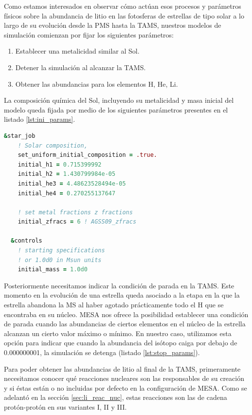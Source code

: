 Como estamos interesados en observar cómo actúan esos procesos y parámetros físicos sobre la abundancia de litio en las fotosferas de estrellas de tipo solar a lo largo de su evolución desde la PMS hasta la TAMS, nuestros modelos de simulación comienzan por fijar los siguientes parámetros:

\begin{enumerate}
    \item Establecer una metalicidad similar al Sol.
    \item Detener la simulación al alcanzar la TAMS.
    \item Obtener las abundancias para los elementos H, He, Li.
\end{enumerate}

La composición química del Sol, incluyendo su metalicidad y masa inicial del modelo queda fijada por medio de los siguientes parámetros presentes en el listado \ref{lst:ini_params}.

\begin{lstlisting}[language=Fortran, float, caption={Parametrización de la metalicidad y masa inicial de la estrella.}, label={lst:ini_params}]
  &star_job
    ! Solar composition, 
    set_uniform_initial_composition = .true.
    initial_h1 = 0.715399992
    initial_h2 = 1.430799984e-05
    initial_he3 = 4.48623528494e-05
    initial_he4 = 0.270255137647

    ! set metal fractions z fractions
    initial_zfracs = 6 ! AGSS09_zfracs

  &controls
    ! starting specifications
    ! or 1.0d0 in Msun units
    initial_mass = 1.0d0 
\end{lstlisting}

Posteriormente necesitamos indicar la condición de parada en la TAMS. Este momento en la evolución de una estrella queda asociado a la etapa en la que la estrella abandona la MS al haber agotado prácticamente todo el H que se encontraba en su núcleo. MESA nos ofrece la posibilidad establecer una condición de parada cuando las abundancias de ciertos elementos en el núcleo de la estrella alcanzan un cierto valor máximo o mínimo. En nuestro caso, utilizamos esta opción para indicar que cuando la abundancia del isótopo  caiga por debajo de 0.000000001, la simulación se detenga (listado \ref{lst:stop_params}).\par

Para poder obtener las abundancias de litio al final de la TAMS, primeramente necesitamos conocer qué reacciones nucleares son las responsables de su creación y si éstas están o no incluidas por defecto en la configuración de MESA. Como se adelantó en la sección \ref{sec:li_reac_nuc}, estas reacciones son las de cadena protón-protón en sus variantes I, II y III.\par


